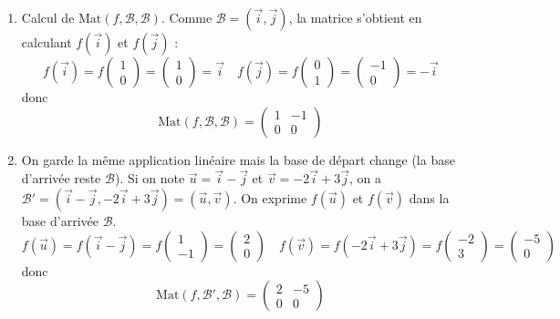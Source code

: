 \documentclass[11pt,a4paper]{article}
\begin{document}
\begin{enumerate}
  \item Calcul de $\textrm{Mat}(f,\mathcal{B},\mathcal{B})$.
Comme $\mathcal{B}=(\vec{i}, \vec{j})$, la matrice s'obtient en calculant $f(\vec{i})$ et $f(\vec{j})$ :
$$f(\vec{i})=f\begin{pmatrix}1\\0\end{pmatrix} = \begin{pmatrix}1\\0\end{pmatrix} = \vec{i}
\quad 
f(\vec{j})=f\begin{pmatrix}0\\1\end{pmatrix} = \begin{pmatrix}-1\\0\end{pmatrix} = -\vec{i}$$
donc
$$\textrm{Mat}(f,\mathcal{B},\mathcal{B}) = \begin{pmatrix} 1 & -1 \\ 0 & 0 \end{pmatrix}$$

  \item On garde la même application linéaire mais la base de départ change (la base d'arrivée reste $\mathcal{B}$).
Si on note $\vec{u} = \vec{i}-\vec{j}$ et $\vec{v} = -2\vec{i}+3\vec{j}$, on a 
$\mathcal{B'}=(\vec{i} - \vec{j}, -2\vec{i}+3\vec{j}) = (\vec{u},\vec{v})$. On exprime 
$f(\vec{u})$ et $f(\vec{v})$ dans la base d'arrivée $\mathcal{B}$.
$$f(\vec{u})=f(\vec{i}- \vec{j})=f\begin{pmatrix}1\\-1\end{pmatrix} = \begin{pmatrix}2\\0\end{pmatrix}
\quad 
f(\vec{v})=f(-2\vec{i}+3\vec{j})=f\begin{pmatrix}-2\\3\end{pmatrix} = \begin{pmatrix}-5\\0\end{pmatrix}$$
donc
$$\textrm{Mat}(f,\mathcal{B}',\mathcal{B}) = \begin{pmatrix} 2 & -5 \\ 0 & 0 \end{pmatrix}$$
  

\end{enumerate}
\end{document}
